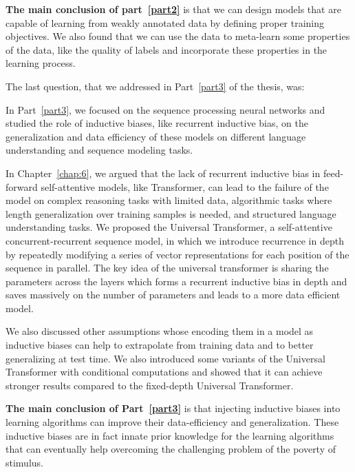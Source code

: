\textbf{The main conclusion of part~\ref{part2}} is that we can design models that are capable of learning from weakly annotated data by defining proper training objectives. We also found that we can use the data to meta-learn some properties of the data, like the quality of labels and incorporate these properties in the learning process.

\bigskip
The last question, that we addressed in Part~\ref{part3} of the thesis, was:
%

In Part~\ref{part3}, we focused on the sequence processing neural networks and studied the role of inductive biases, like recurrent inductive bias, on the generalization and data efficiency of these models on different language understanding and sequence modeling tasks.

In Chapter~\ref{chap:6}, we argued that the lack of recurrent inductive bias in feed-forward self-attentive models, like Transformer, can lead to the failure of the model on complex reasoning tasks with limited data, algorithmic tasks where length generalization over training samples is needed, and structured language understanding tasks. We proposed the Universal Transformer, a self-attentive concurrent-recurrent sequence model, in which we introduce recurrence in depth by repeatedly modifying a series of vector representations for each position of the sequence in parallel. The key idea of the universal transformer is sharing the parameters across the layers which forms a recurrent inductive bias in depth and saves massively on the number of parameters and leads to a more data efficient model. 

We also discussed other assumptions whose encoding them in a model as inductive biases can help to extrapolate from training data and to better generalizing at test time.  We also introduced some variants of the Universal Transformer with conditional computations and showed that it can achieve stronger results compared to the fixed-depth Universal Transformer.

\textbf{The main conclusion of Part~\ref{part3}} is that injecting inductive biases into learning algorithms can improve their data-efficiency and generalization. These inductive biases are in fact innate prior knowledge for the learning algorithms that can eventually help overcoming the challenging problem of the poverty of stimulus.

